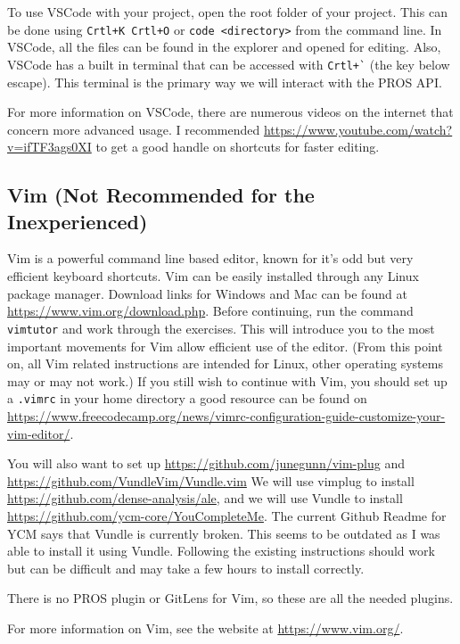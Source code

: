 \documentclass[main.tex]{subfiles}
\begin{document}
To use VSCode with your project, open the root folder of your project.
This can be done using \verb|Crtl+K Crtl+O| or \verb|code <directory>| from the command line.
In VSCode, all the files can be found in the explorer and opened for editing.
Also, VSCode has a built in terminal that can be accessed with \verb|Crtl+`| (the key below escape).
This terminal is the primary way we will interact with the PROS API.

For more information on VSCode, there are numerous videos on the internet that concern more advanced usage.
I recommended \href{Fireship}{https://www.youtube.com/watch?v=ifTF3ags0XI} to get a good handle on shortcuts for faster editing.

\subsection{Vim (Not Recommended for the Inexperienced)}
Vim is a powerful command line based editor, known for it's odd but very efficient keyboard shortcuts.
Vim can be easily installed through any Linux package manager.
Download links for Windows and Mac can be found at \url{https://www.vim.org/download.php}.
Before continuing, run the command \verb|vimtutor| and work through the exercises.
This will introduce you to the most important movements for Vim allow efficient use of the editor.
(From this point on, all Vim related instructions are intended for Linux, other operating systems may or may not work.)
If you still wish to continue with Vim, you should set up a \verb|.vimrc| in your home directory 
    a good resource can be found on \href{Free Code Camp}{https://www.freecodecamp.org/news/vimrc-configuration-guide-customize-your-vim-editor/}.

You will also want to set up \href{vimplug}{https://github.com/junegunn/vim-plug} and \href{Vundle}{https://github.com/VundleVim/Vundle.vim}
We will use vimplug to install \href{Asynchronous Lint Engine (ALE)}{https://github.com/dense-analysis/ale},
    and we will use Vundle to install \href{YouCompleteMe (YCM)}{https://github.com/ycm-core/YouCompleteMe}.
The current Github Readme for YCM says that Vundle is currently broken.
This seems to be outdated as I was able to install it using Vundle.
Following the existing instructions should work but can be difficult and may take a few hours to install correctly.

There is no PROS plugin or GitLens for Vim, so these are all the needed plugins.

For more information on Vim, see the website at \url{https://www.vim.org/}.
\end{document}
